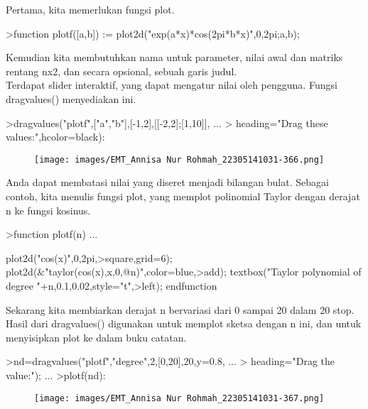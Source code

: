 \documentclass[a4paper,10pt]{article}
\begin{document}
\begin{eulernotebook}
\begin{eulercomment}
Pertama, kita memerlukan fungsi plot.
\end{eulercomment}
\begin{eulerprompt}
>function plotf([a,b]) := plot2d("exp(a*x)*cos(2pi*b*x)",0,2pi;a,b);
\end{eulerprompt}
\begin{eulercomment}
Kemudian kita membutuhkan nama untuk parameter, nilai awal dan matriks
rentang nx2, dan secara opsional, sebuah garis judul.\\
Terdapat slider interaktif, yang dapat mengatur nilai oleh pengguna.
Fungsi dragvalues() menyediakan ini.
\end{eulercomment}
\begin{eulerprompt}
>dragvalues("plotf",["a","b"],[-1,2],[[-2,2];[1,10]], ...
>  heading="Drag these values:",hcolor=black):
\end{eulerprompt}
\begin{figure}[h]
    \centering
    \texttt{[image: images/EMT\_Annisa Nur Rohmah\_22305141031-366.png]}
\end{figure}
\begin{eulercomment}
Anda dapat membatasi nilai yang diseret menjadi bilangan bulat.
Sebagai contoh, kita menulis fungsi plot, yang memplot polinomial
Taylor dengan derajat n ke fungsi kosinus.
\end{eulercomment}
\begin{eulerprompt}
>function plotf(n) ...
\end{eulerprompt}
\begin{eulerudf}
  plot2d("cos(x)",0,2pi,>square,grid=6);
  plot2d(&"taylor(cos(x),x,0,@n)",color=blue,>add);
  textbox("Taylor polynomial of degree "+n,0.1,0.02,style="t",>left);
  endfunction
\end{eulerudf}
\begin{eulercomment}
Sekarang kita membiarkan derajat n bervariasi dari 0 sampai 20 dalam
20 stop. Hasil dari dragvalues() digunakan untuk memplot sketsa dengan
n ini, dan untuk menyisipkan plot ke dalam buku catatan.
\end{eulercomment}
\begin{eulerprompt}
>nd=dragvalues("plotf","degree",2,[0,20],20,y=0.8, ...
>   heading="Drag the value:"); ...
>plotf(nd):
\end{eulerprompt}
\begin{figure}[h]
    \centering
    \texttt{[image: images/EMT\_Annisa Nur Rohmah\_22305141031-367.png]}
\end{figure}
\begin{eulercomment}

\end{eulercomment}
\end{eulernotebook}
\end{document}

